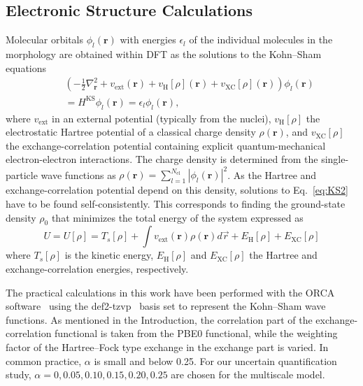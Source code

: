 \documentclass[%
 reprint,
superscriptaddress,
 amsmath,amssymb,
 aps,
prb,
floatfix
]{revtex4-2}
\begin{document}
\subsection{Electronic Structure Calculations} 
\label{sec:es}
Molecular orbitals $\phi_l (\mathbf{r})$ with energies $\epsilon_l$ of the individual molecules in the morphology are obtained within DFT as the solutions to the  Kohn--Sham equations~\cite{kohn_self_1965}
%
\begin{eqnarray}
    && \left(-\frac{1}{2}\nabla^2_{\mathbf{r}} + v_\text{ext}(\mathbf{r}) + v_\text{H}[\rho](\mathbf{r}) + v_\text{XC}[\rho](\mathbf{r})\right) \phi_l(\mathbf{r}) \nonumber \\
    && = H^\text{KS} \phi_l(\mathbf{r}) = \epsilon_l \phi_l (\mathbf{r}) ,
    \label{eq:KS2}
\end{eqnarray}
%
where $v_\text{ext}$ in an external potential (typically from the nuclei), $v_\text{H}[\rho]$ the electrostatic Hartree potential of a classical charge density $\rho(\mathbf{r})$, and $v_\text{XC}[\rho]$ the exchange-correlation potential containing explicit quantum-mechanical electron-electron interactions. The charge density is determined from the single-particle wave functions as $\rho(\mathbf{r})=\sum\limits_{l=1}^{N_\text{el}} \left\vert\phi_l(\mathbf{r})\right\vert^2$. As the Hartree and exchange-correlation potential depend on this density, solutions to Eq.~\ref{eq:KS2} have to be found self-consistently. This corresponds to finding the ground-state density $\rho_0$ that minimizes the total energy of the system expressed as
%
\begin{equation}
    U=U[\rho] = T_s[\rho] + \int v_\text{ext}(\mathbf{r}) \rho(\mathbf{r}) d \vec{r} + E_\text{H}[\rho] + E_\text{XC}[\rho]
    \label{eq:KS_model}
\end{equation}
%
where $T_s[\rho]$ is the kinetic energy, $E_\text{H}[\rho]$ and $E_\text{XC}[\rho]$ the Hartree and exchange-correlation energies, respectively. 

The practical calculations in this work have been performed with the ORCA software~\cite{Neese2012a} using the def2-tzvp~\cite{weigend_accurate_2006} basis set to represent the Kohn--Sham wave functions. As mentioned in the Introduction, the correlation part of the exchange-correlation functional is taken from the PBE0 functional, while the weighting factor of the Hartree--Fock type exchange in the exchange part is varied. In common practice, $\alpha$ is small and below 0.25. For our uncertain quantification study, $\alpha=0,0.05,0.10,0.15,0.20,0.25$ are chosen for the multiscale model.
\end{document}
